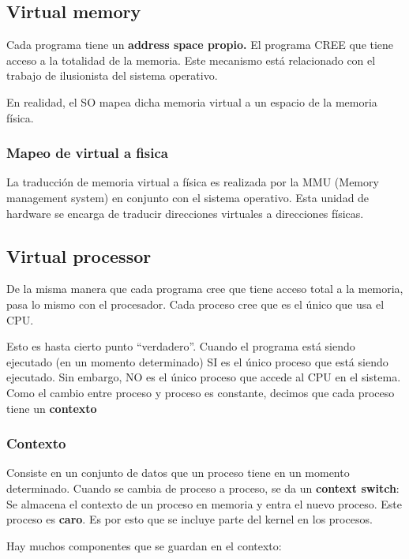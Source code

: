\documentclass{article}
\begin{document}
\subsection{Virtual memory}\label{virtual-memory}

Cada programa tiene un \textbf{address space propio.} El programa CREE
que tiene acceso a la totalidad de la memoria. Este mecanismo está
relacionado con el trabajo de ilusionista del sistema operativo.

En realidad, el SO mapea dicha memoria virtual a un espacio de la
memoria física.

\subsubsection{Mapeo de virtual a
fisica}\label{mapeo-de-virtual-a-fisica}

La traducción de memoria virtual a física es realizada por la MMU
(Memory management system) en conjunto con el sistema operativo. Esta
unidad de hardware se encarga de traducir direcciones virtuales a
direcciones físicas.

\subsection{Virtual processor}\label{virtual-processor}

De la misma manera que cada programa cree que tiene acceso total a la
memoria, pasa lo mismo con el procesador. Cada proceso cree que es el
único que usa el CPU.

Esto es hasta cierto punto ``verdadero''. Cuando el programa está siendo
ejecutado (en un momento determinado) SI es el único proceso que está
siendo ejecutado. Sin embargo, NO es el único proceso que accede al CPU
en el sistema. Como el cambio entre proceso y proceso es constante,
decimos que cada proceso tiene un \textbf{contexto}

\subsubsection{Contexto}\label{contexto}

Consiste en un conjunto de datos que un proceso tiene en un momento
determinado. Cuando se cambia de proceso a proceso, se da un
\textbf{context switch}: Se almacena el contexto de un proceso en
memoria y entra el nuevo proceso. Este proceso es \textbf{caro}. Es por
esto que se incluye parte del kernel en los procesos.

Hay muchos componentes que se guardan en el contexto:
\end{document}
